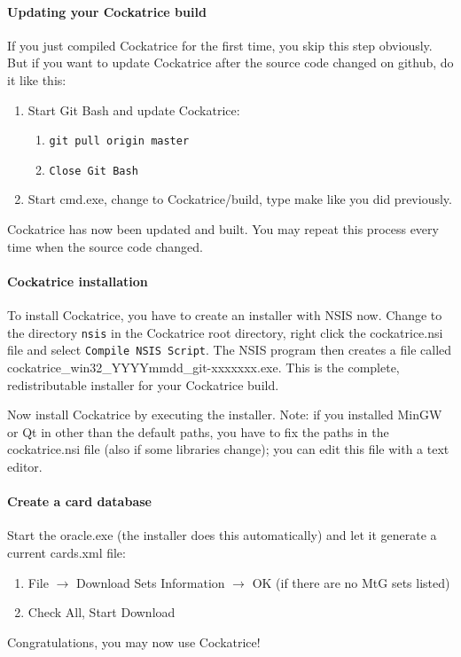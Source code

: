 \documentclass[a4paper]{scrbook}
\newcommand{\shellcmd}[1]{\texttt{\scriptsize #1}}
\begin{document}
\paragraph{Updating your Cockatrice build}
If you just compiled Cockatrice for the first time, you skip this step obviously.
But if you want to update Cockatrice after the source code changed on github, do it like this:
\begin{enumerate}
 \item Start Git Bash and update Cockatrice:
    \begin{enumerate}
     \item \shellcmd{git pull origin master}
     \item \shellcmd{Close Git Bash}
    \end{enumerate}
 \item Start cmd.exe, change to Cockatrice/build, type make like you did previously.
\end{enumerate}
Cockatrice has now been updated and built. You may repeat this process every time when the source code changed.

\paragraph{Cockatrice installation}
To install Cockatrice, you have to create an installer with NSIS now.
Change to the directory \shellcmd{nsis} in the Cockatrice root directory, right click the cockatrice.nsi file and select \shellcmd{Compile NSIS Script}.
The NSIS program then creates a file called cockatrice\_win32\_YYYYmmdd\_git-xxxxxxx.exe. This is the complete, redistributable installer for your Cockatrice build.

Now install Cockatrice by executing the installer.
Note: if you installed MinGW or Qt in other than the default paths, you have to fix the paths in the cockatrice.nsi file (also if some libraries change); you can edit this file with a text editor.

\paragraph{Create a card database}
Start the oracle.exe (the installer does this automatically) and let it generate a current cards.xml file:
\begin{enumerate}
 \item File $\to$ Download Sets Information $\to$ OK (if there are no MtG sets listed)
 \item Check All, Start Download
\end{enumerate}
Congratulations, you may now use Cockatrice!
\end{document}
